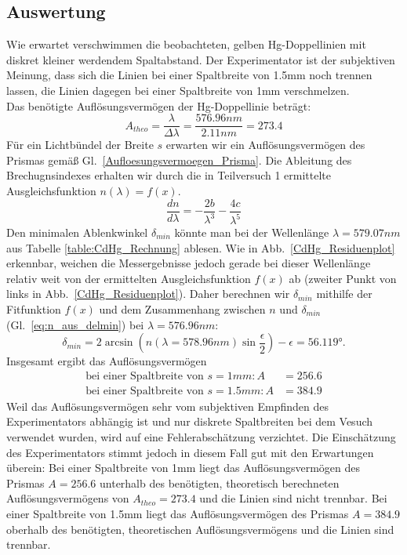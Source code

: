 \documentclass[12pt,a4paper]{article}
\begin{document}
\subsection{Auswertung}
Wie erwartet verschwimmen die beobachteten, gelben Hg-Doppellinien mit diskret kleiner werdendem Spaltabstand. Der Experimentator ist der subjektiven Meinung, dass sich die Linien bei einer Spaltbreite von 1.5mm noch trennen lassen, die Linien dagegen bei einer Spaltbreite von 1mm verschmelzen.\\
Das benötigte Auflösungsvermögen der Hg-Doppellinie beträgt:
\begin{equation}
A_{theo}=\frac{\lambda}{\Delta\lambda}=\frac{576.96nm}{2.11nm}=273.4
\end{equation}
Für ein Lichtbündel der Breite $s$ erwarten wir ein Auflösungsvermögen des Prismas gemäß Gl.~\ref{Aufloesungsvermoegen_Prisma}. Die Ableitung des Brechugnsindexes erhalten wir durch die in Teilversuch 1 ermittelte Ausgleichsfunktion $n(\lambda)=f(x)$. 
\begin{equation}
\frac{dn}{d\lambda}=-\frac{2b}{\lambda^3}-\frac{4c}{\lambda^5}
\end{equation}
Den minimalen Ablenkwinkel $\delta_{min}$ könnte man bei der Wellenlänge $\lambda=579.07nm$ aus Tabelle \ref{table:CdHg_Rechnung} ablesen. Wie in Abb.~\ref{CdHg_Residuenplot} erkennbar, weichen die Messergebnisse jedoch gerade bei dieser Wellenlänge relativ weit von der ermittelten Ausgleichsfunktion $f(x)$ ab (zweiter Punkt von links in Abb.~\ref{CdHg_Residuenplot}). Daher berechnen wir $\delta_{min}$ mithilfe der Fitfunktion $f(x)$ und dem Zusammenhang zwischen $n$ und $\delta_{min}$ (Gl.~\eqref{eq:n_aus_delmin}) bei $\lambda=576.96nm$:
\begin{equation}
\delta_{min}=2\arcsin\left(n(\lambda=578.96nm)\sin{\frac{\epsilon}{2}}\right)-\epsilon=\ang{56.119}.
\end{equation}
Insgesamt ergibt das Auflösungsvermögen
\begin{align}
\text{bei einer Spaltbreite von }s=1mm:A&=256.6\\
\text{bei einer Spaltbreite von }s=1.5mm:A&=384.9
\end{align}
Weil das Auflösungsvermögen sehr vom subjektiven Empfinden des Experimentators abhängig ist und nur diskrete Spaltbreiten bei dem Vesuch verwendet wurden, wird auf eine Fehlerabschätzung verzichtet. Die Einschätzung des Experimentators stimmt jedoch in diesem Fall gut mit den Erwartungen überein: Bei einer Spaltbreite von 1mm liegt das Auflösungsvermögen des Prismas $A=256.6$ unterhalb des benötigten, theoretisch berechneten Auflösungsvermögens von $A_{theo}=273.4$ und die Linien sind nicht trennbar. Bei einer Spaltbreite von 1.5mm liegt das Auflösungsvermögen des Prismas $A=384.9$ oberhalb des benötigten, theoretischen Auflösungsvermögens und die Linien sind trennbar.
\end{document}
